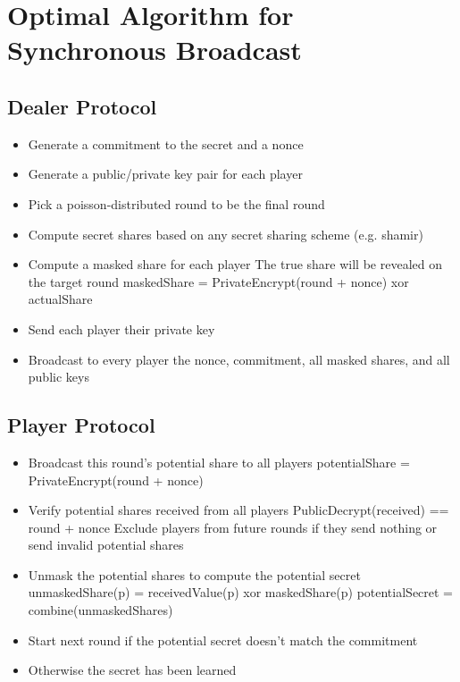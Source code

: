 \documentclass{article}
\begin{document}
\section{Optimal Algorithm for Synchronous Broadcast}
\subsection{Dealer Protocol}
\begin{itemize}
	\item Generate a commitment to the secret and a nonce
	\item Generate a public/private key pair for each player
	\item Pick a poisson-distributed round to be the final round
	\item Compute secret shares based on any secret sharing scheme (e.g. shamir)
	\item Compute a masked share for each player 
	\subitem The true share will be revealed on the target round
	\subitem maskedShare = PrivateEncrypt(round + nonce) xor actualShare
	\item Send each player their private key
	\item Broadcast to every player the nonce, commitment, all masked shares, and all public keys
\end{itemize}
\subsection{Player Protocol}
\begin{itemize}
	\item Broadcast this round's potential share to all players
	\subitem potentialShare = PrivateEncrypt(round + nonce)
	\item Verify potential shares received from all players
	\subitem PublicDecrypt(received) == round + nonce
	\subitem Exclude players from future rounds if they send nothing or send invalid potential shares
	\item Unmask the potential shares to compute the potential secret
	\subitem unmaskedShare(p) = receivedValue(p) xor maskedShare(p)
	\subitem potentialSecret = combine(unmaskedShares)
	\item Start next round if the potential secret doesn't match the commitment
	\item Otherwise the secret has been learned
\end{itemize}
\end{document}
